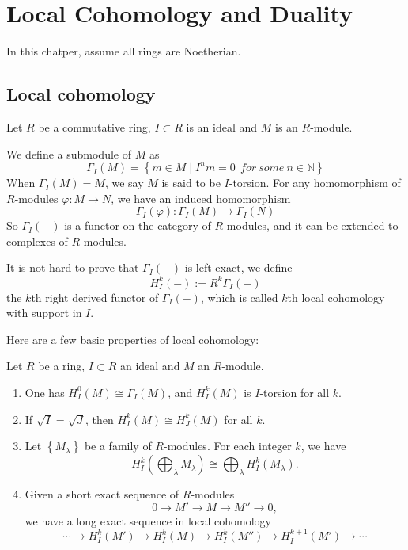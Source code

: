 \chapter{Local Cohomology and Duality}

In this chatper, assume all rings are Noetherian.

\section{Local cohomology}

Let \(R\) be a commutative ring, \(I\subset R\) is an ideal and \(M\) is an \(R\)-module. 

\begin{definition}
     We define a submodule of \(M\) as 
     \[\Gamma_I(M)=\left\{ m\in M\mid I^nm=0\ \ for\ some\ n\in \mathbb{N} \right\}\]
     When \(\Gamma_I(M)=M\), we say \(M\) is said to be \(I\)-torsion. For any homomorphism of \(R\)-modules \(\varphi:M\rightarrow N\), we have an induced homomorphism
     \[\Gamma_I(\varphi):\Gamma_I(M)\rightarrow \Gamma_I(N)\]
     So \(\Gamma_I(-)\) is a functor on the category of \(R\)-modules, and it can be extended to complexes of \(R\)-modules.

     It is not hard to prove that \(\Gamma_I(-)\) is left exact, we define 
     \[H^k_I(-):=R^k\Gamma_I(-)\]
     the \(k\)th right derived functor of \(\Gamma_I(-)\), which is called \(k\)th local cohomology with support in \(I\).
\end{definition}

Here are a few basic properties of local cohomology:

\begin{proposition} 
     Let \(R\) be a ring, \(I\subset R\) an ideal and \(M\) an \(R\)-module.
     \begin{enumerate}[(1)]
       \item One has \(H_I^0(M)\cong \Gamma_I(M)\), and \(H^k_I(M)\) is \(I\)-torsion for all \(k\).
       \item If \(\sqrt{I}=\sqrt{J}\), then \(H_I^k(M)\cong H_J^k(M)\) for all \(k\).
       \item Let \(\left\{ M_\lambda \right\}\) be a family of \(R\)-modules. For each integer \(k\), we have 
       \[H^k_I(\bigoplus_\lambda M_\lambda)\cong \bigoplus_\lambda H^k_I(M_\lambda).\]
       \item Given a short exact sequence of \(R\)-modules 
       \[0\rightarrow M'\rightarrow M\rightarrow M''\rightarrow 0,\]
       we have a long exact sequence in local cohomology
       \[\cdots\rightarrow H^k_I(M')\rightarrow H^k_I(M)\rightarrow H^k_I(M'')\rightarrow H^{k+1}_I(M')\rightarrow \cdots\]
     \end{enumerate}
\end{proposition}

